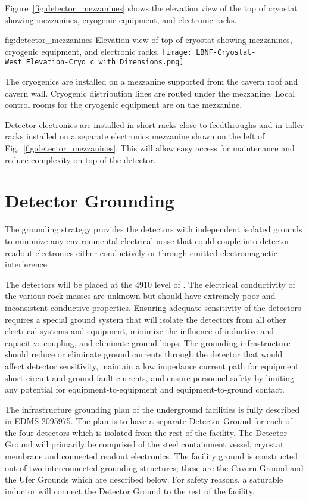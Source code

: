 Figure~\ref{fig:detector_mezzanines} shows the elevation view of the
top of cryostat showing mezzanines, cryogenic equipment, and
electronic racks.
\begin{dunefigure}{fig:detector_mezzanines}
  {Elevation view of top of cryostat showing mezzanines, cryogenic
    equipment, and electronic racks.}
  \texttt{[image: LBNF-Cryostat-West\_Elevation-Cryo\_c\_with\_Dimensions.png]}
\end{dunefigure}
The cryogenics are installed on a mezzanine supported from
the cavern roof and cavern wall. Cryogenic distribution lines are
routed under the mezzanine. Local control rooms for the
cryogenic equipment are on the mezzanine.

Detector electronics are installed in short racks close to
feedthroughs and in taller racks installed on a separate electronics
mezzanine shown on the left of Fig.~\ref{fig:detector_mezzanines}.
This will allow easy access for maintenance and reduce complexity on
top of the detector.

\section{Detector Grounding}
\label{sec:fdsp-coord-faci-grounding}


The grounding strategy provides the detectors with independent
isolated grounds to minimize any environmental electrical noise that
could couple into detector readout electronics either conductively or
through emitted electromagnetic interference.

The detectors will be placed at the 4910 level of \surf. The
electrical conductivity of the various rock masses are unknown but
should have extremely poor and inconsistent conductive
properties. Ensuring adequate sensitivity of the detectors requires a
special ground system that will isolate the detectors from all other
electrical systems and equipment, minimize the influence of inductive
and capacitive coupling, and eliminate ground loops. The grounding
infrastructure should reduce or eliminate ground currents through the
detector that would affect detector sensitivity, maintain a low
impedance current path for equipment short circuit and ground fault
currents, and ensure personnel safety by limiting any potential for
equipment-to-equipment and equipment-to-ground contact.

The infrastructure grounding plan of the underground facilities is
fully described in EDMS 2095975.  The plan is to have a separate
Detector Ground for each of the four detectors which is isolated from
the rest of the facility.  The Detector Ground will primarily be
comprised of the steel containment vessel, cryostat membrane and
connected readout electronics.  The facility ground is constructed out
of two interconnected grounding structures; these are the Cavern
Ground and the Ufer Grounds which are described below.  For safety
reasons, a saturable inductor will connect the Detector Ground to the
rest of the facility.

